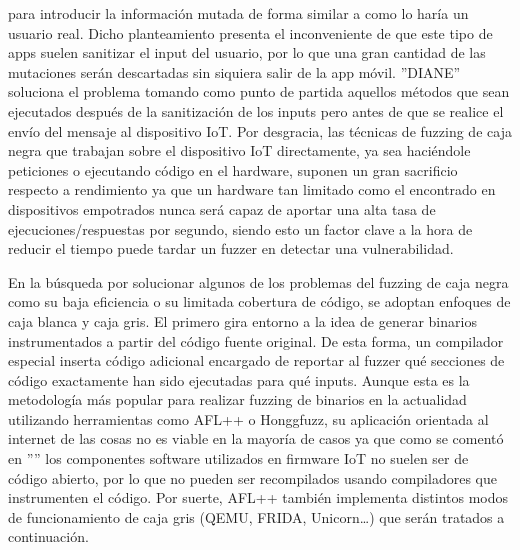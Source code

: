 para introducir la información mutada de forma similar a como lo haría un usuario real. Dicho planteamiento presenta el inconveniente de que este tipo 
de apps suelen sanitizar el input del usuario, por lo que una gran cantidad de las mutaciones serán descartadas sin siquiera salir de la app móvil.
''DIANE'' soluciona el problema tomando como punto de partida aquellos métodos que sean ejecutados después de la sanitización de los inputs pero antes de
que se realice el envío del mensaje al dispositivo IoT. Por desgracia, las técnicas de fuzzing de caja negra que trabajan sobre el dispositivo IoT
directamente, ya sea haciéndole peticiones o ejecutando código en el hardware, suponen un gran sacrificio respecto a rendimiento ya que un hardware 
tan limitado como el encontrado en dispositivos empotrados nunca será capaz de aportar una alta tasa de ejecuciones/respuestas por segundo, siendo esto un 
factor clave a la hora de reducir el tiempo puede tardar un fuzzer en detectar una vulnerabilidad.

En la búsqueda por solucionar algunos de los problemas del fuzzing de caja negra como su baja eficiencia o su limitada cobertura de código, se 
adoptan enfoques de caja blanca y caja gris. El primero gira entorno a la idea de generar binarios instrumentados a partir del código fuente original. De esta forma, un compilador 
especial inserta código adicional encargado de reportar al fuzzer qué secciones de código exactamente han sido ejecutadas para qué inputs.
Aunque esta es la metodología más popular para realizar fuzzing de binarios en la actualidad utilizando herramientas como AFL++\cite{afl++} o 
Honggfuzz\cite{honggfuzz}, su aplicación orientada al internet de las cosas no es viable en la mayoría de casos ya que como se comentó en 
'''' los componentes software utilizados en firmware IoT no suelen ser de código abierto, por lo que no pueden ser recompilados 
usando compiladores que instrumenten el código. Por suerte, AFL++ también implementa distintos modos de funcionamiento de caja gris
(QEMU\cite{qemuafl}, FRIDA\cite{frida}, Unicorn\cite{unicorn}\dots) que serán tratados a continuación.\bigskip

